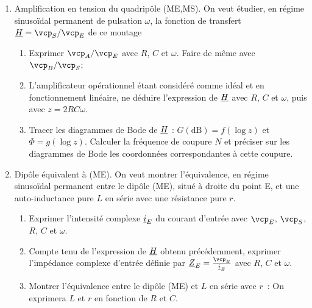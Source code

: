 \begin{exercice}
	\begin{enumerate}
		\item Amplification en tension du quadripôle (ME,MS). On veut étudier, en régime sinusoïdal permanent de pulsation $\omega$, la fonction de transfert $\Hc = \vcp_S / \vcp_E$ de ce montage
		\begin{enumerate}			
			\item Exprimer $\vcp_A/\vcp_E$ avec $R$, $C$ et $\omega$. Faire de même avec $\vcp_B/\vcp_S$;
			\item L'amplificateur opérationnel étant considéré comme idéal et en fonctionnement linéaire, ne déduire l'expression de $\underline{H}$ avec $R$, $C$ et $\omega$, puis avec $z=2RC\omega$.
			\item Tracer les diagrammes de Bode de $\underline{H}$ : $G(\si{\dB}) = f(\log z)$ et $\Phi = g(\log z)$. Calculer la fréquence de coupure $N$ et préciser sur les diagrammes de Bode les coordonnées correspondantes à cette coupure.
		\end{enumerate}
		\item Dipôle équivalent à (ME). On veut montrer l'équivalence, en régime sinusoïdal permanent entre le dipôle (ME), situé à droite du point E, et une auto-inductance pure $L$ en série avec une résistance pure $r$.
		\begin{enumerate}
			\item Exprimer l'intensité complexe $\underline{i}_E$ du courant d'entrée avec $\vcp_E$, $\vcp_S$, $R$, $C$ et $\omega$.
			\item Compte tenu de l'expression de $\underline{H}$ obtenu précédemment, exprimer l'impédance complexe d'entrée définie par $\Zc_E = \frac{\vcp_E}{\ic_E}$ avec $R$, $C$ et $\omega$.
			\item Montrer l'équivalence entre le dipôle (ME) et $L$ en série avec $r$~: On exprimera $L$ et $r$ en fonction de $R$ et $C$.
		\end{enumerate}
	\end{enumerate}
\end{exercice}
